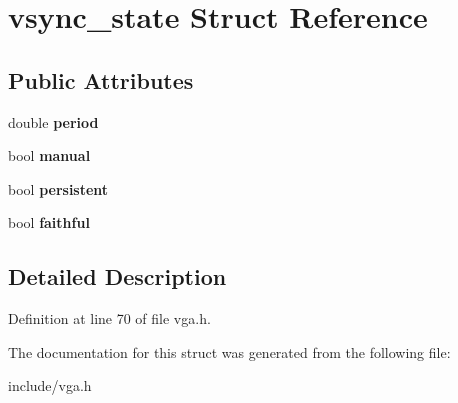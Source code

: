 \hypertarget{structvsync__state}{\section{vsync\-\_\-state Struct Reference}
\label{structvsync__state}
}
\subsection*{Public Attributes}
\begin{DoxyCompactItemize}
\item 
\hypertarget{structvsync__state_ab31e356f8dda57db35c1424304ac5f44}{double {\bfseries period}}\label{structvsync__state_ab31e356f8dda57db35c1424304ac5f44}

\item 
\hypertarget{structvsync__state_a464f94268847e463a0ec9b7657661a86}{bool {\bfseries manual}}\label{structvsync__state_a464f94268847e463a0ec9b7657661a86}

\item 
\hypertarget{structvsync__state_a43ed386d0d457124256caad15f108bac}{bool {\bfseries persistent}}\label{structvsync__state_a43ed386d0d457124256caad15f108bac}

\item 
\hypertarget{structvsync__state_a23b2944857c4a4191aa0c73a7fc1929b}{bool {\bfseries faithful}}\label{structvsync__state_a23b2944857c4a4191aa0c73a7fc1929b}

\end{DoxyCompactItemize}


\subsection{Detailed Description}


Definition at line 70 of file vga.\-h.



The documentation for this struct was generated from the following file\-:\begin{DoxyCompactItemize}
\item 
include/vga.\-h\end{DoxyCompactItemize}
